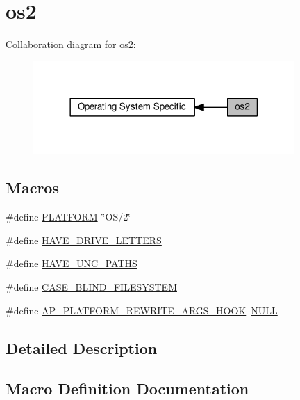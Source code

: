 \hypertarget{group__APACHE__OS__OS2}{}\section{os2}
\label{group__APACHE__OS__OS2}
Collaboration diagram for os2\+:
\nopagebreak
\begin{figure}[H]
\begin{center}
\leavevmode
\includegraphics[width=282pt]{group__APACHE__OS__OS2}
\end{center}
\end{figure}
\subsection*{Macros}
\begin{DoxyCompactItemize}
\item 
\#define \hyperlink{group__APACHE__OS__OS2_ga1fa4f1561216be34f745f32aaa38d943}{P\+L\+A\+T\+F\+O\+RM}~\char`\"{}OS/2\char`\"{}
\item 
\#define \hyperlink{group__APACHE__OS__OS2_ga3637584fee051a4684a19e7ed959ea69}{H\+A\+V\+E\+\_\+\+D\+R\+I\+V\+E\+\_\+\+L\+E\+T\+T\+E\+RS}
\item 
\#define \hyperlink{group__APACHE__OS__OS2_ga9a257956274b28146a5ba329f58db900}{H\+A\+V\+E\+\_\+\+U\+N\+C\+\_\+\+P\+A\+T\+HS}
\item 
\#define \hyperlink{group__APACHE__OS__OS2_ga34e00ba2dd9716e8d7f289bf66ce53b6}{C\+A\+S\+E\+\_\+\+B\+L\+I\+N\+D\+\_\+\+F\+I\+L\+E\+S\+Y\+S\+T\+EM}
\item 
\#define \hyperlink{group__APACHE__OS__OS2_gafadf468b66524ea08fc3536aead78644}{A\+P\+\_\+\+P\+L\+A\+T\+F\+O\+R\+M\+\_\+\+R\+E\+W\+R\+I\+T\+E\+\_\+\+A\+R\+G\+S\+\_\+\+H\+O\+OK}~\hyperlink{pcre_8txt_ad7f989d16aa8ca809a36bc392c07fba1}{N\+U\+LL}
\end{DoxyCompactItemize}


\subsection{Detailed Description}


\subsection{Macro Definition Documentation}
